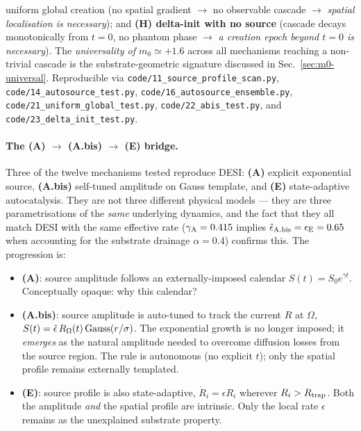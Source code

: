 \documentclass[11pt,a4paper]{article}
\begin{document}
\begin{table}[!htbp]
{{uniform global creation} (no spatial gradient $\to$ no observable
cascade $\to$ \emph{spatial localisation is necessary}); and
\textbf{(H) delta-init with no source} (cascade decays monotonically
from $t=0$, no phantom phase $\to$ \emph{a creation epoch beyond
$t=0$ is necessary}). The \emph{universality of $m_0 \simeq +1.6$}
across all mechanisms reaching a non-trivial cascade is the
substrate-geometric signature discussed in
Sec.~\ref{sec:m0-universal}. Reproducible via
\texttt{code/11\_source\_profile\_scan.py},
\texttt{code/14\_autosource\_test.py},
\texttt{code/16\_autosource\_ensemble.py},
\texttt{code/21\_uniform\_global\_test.py},
\texttt{code/22\_abis\_test.py}, and
\texttt{code/23\_delta\_init\_test.py}.}
\label{tab:mechanism-comparison}
\end{table}

\paragraph{The (A) $\to$ (A.bis) $\to$ (E) bridge.}\label{sec:bridge}
Three of the twelve mechanisms tested reproduce DESI: \textbf{(A)}
explicit exponential source, \textbf{(A.bis)} self-tuned amplitude
on Gauss template, and \textbf{(E)} state-adaptive autocatalysis.
They are not three different physical models --- they are three
parametrisations of the \emph{same} underlying dynamics, and the
fact that they all match DESI with the same effective rate
($\gamma_{\rm A} = 0.415$ implies $\tilde\epsilon_{\rm A.bis} =
\epsilon_{\rm E} = 0.65$ when accounting for the substrate drainage
$\alpha = 0.4$) confirms this. The progression is:
\begin{itemize}
\item \textbf{(A)}: source amplitude follows an externally-imposed
calendar $S(t) = S_0 e^{\gamma t}$. Conceptually opaque: why this
calendar?
\item \textbf{(A.bis)}: source amplitude is auto-tuned to track the
current $R$ at $\Omega$, $S(t) = \tilde\epsilon\, R_\Omega(t)\,
{\rm Gauss}(r/\sigma)$. The exponential growth is no longer
imposed; it \emph{emerges} as the natural amplitude needed to
overcome diffusion losses from the source region. The rule is
autonomous (no explicit $t$); only the spatial profile remains
externally templated.
\item \textbf{(E)}: source profile is also state-adaptive,
$\dot R_i = \epsilon R_i$ wherever $R_i > R_{\rm trap}$. Both the
amplitude \emph{and} the spatial profile are intrinsic. Only the
local rate $\epsilon$ remains as the unexplained substrate property.
\end{itemize}
\end{document}
